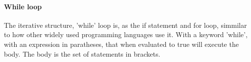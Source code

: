 

\paragraph*{While loop}
The iterative structure, 'while' loop is, as the if statement and for loop, simmilar to how other widely used programming languages use it. With a keyword 'while', with an expression in paratheses, that when evaluated to true will execute the body. The body is the set of statements in brackets. 



